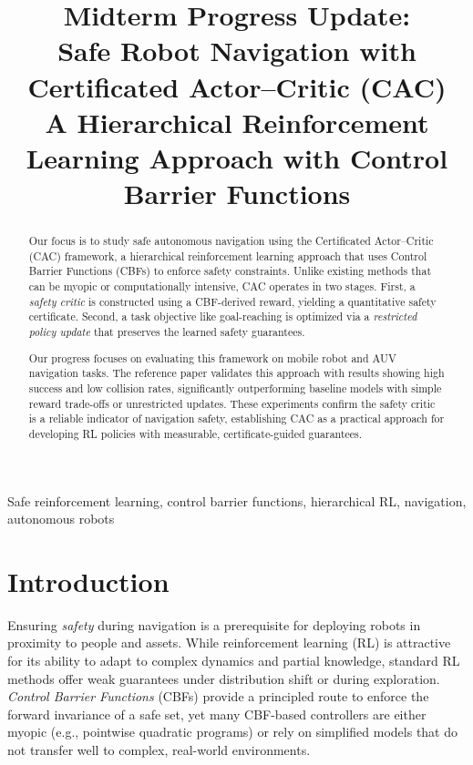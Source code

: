\documentclass[10pt,conference]{IEEEtran}
\begin{document}
\title{Midterm Progress Update:\\
Safe Robot Navigation with Certificated Actor--Critic (CAC)\\
\large A Hierarchical Reinforcement Learning Approach with Control Barrier Functions}

\author{
}

\maketitle

\begin{abstract}
Our focus is to study safe autonomous navigation using the Certificated Actor--Critic (CAC) framework, a hierarchical reinforcement learning approach that uses Control Barrier Functions (CBFs) to enforce safety constraints. Unlike existing methods that can be myopic or computationally intensive, CAC operates in two stages. First, a \emph{safety critic} is constructed using a CBF-derived reward, yielding a quantitative safety certificate. Second, a task objective like goal-reaching is optimized via a \emph{restricted policy update} that preserves the learned safety guarantees.

Our progress focuses on evaluating this framework on mobile robot and AUV navigation tasks. The reference paper validates this approach with results showing high success and low collision rates, significantly outperforming baseline models with simple reward trade-offs or unrestricted updates. These experiments confirm the safety critic is a reliable indicator of navigation safety, establishing CAC as a practical approach for developing RL policies with measurable, certificate-guided guarantees.
\end{abstract}



\begin{IEEEkeywords}
Safe reinforcement learning, control barrier functions, hierarchical RL, navigation, autonomous robots
\end{IEEEkeywords}

\section{Introduction}

Ensuring \emph{safety} during navigation is a prerequisite for deploying robots in proximity to people and assets. While reinforcement learning (RL) is attractive for its ability to adapt to complex dynamics and partial knowledge, standard RL methods offer weak guarantees under distribution shift or during exploration. \emph{Control Barrier Functions} (CBFs) provide a principled route to enforce the forward invariance of a safe set, yet many CBF-based controllers are either myopic (e.g., pointwise quadratic programs) or rely on simplified models that do not transfer well to complex, real-world environments.
\end{document}
